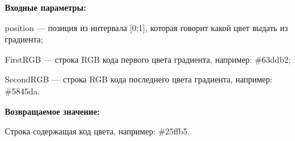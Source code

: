 \textbf{Входные параметры:}

position --- позиция из интервала [0;1], которая говорит какой цвет выдать из градиента;
 
    FirstRGB --- строка RGB кода первого цвета градиента, например: \#63ddb2;
 
    SecondRGB --- строка RGB кода последнего цвета градиента, например: \#5845da.

\textbf{Возвращаемое значение:}

Строка содержащая код цвета, например: \#25ffb5.